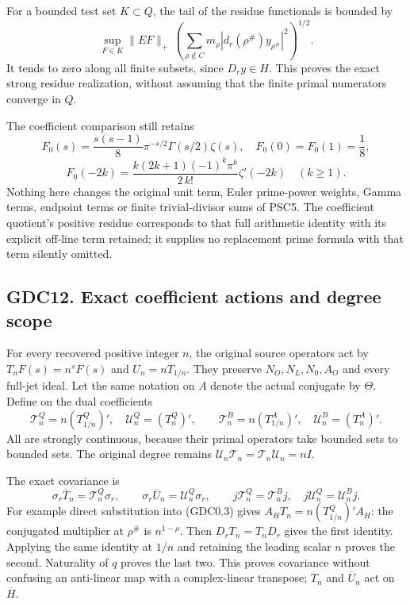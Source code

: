For a bounded test set \(K\subset Q\), the tail of the residue
functionals is bounded by \[
\sup_{F\in K}\|EF\|_+\,
\left(\sum_{\rho\notin C}m_\rho
|d_r(\rho^\#)y_{\rho^\#}|^2\right)^{1/2}.
\tag{GDC11.4}
\] It tends to zero along all finite subsets, since \(D_ry\in H\). This
proves the exact strong residue realization, without assuming that the
finite primal numerators converge in \(Q\).

The coefficient comparison still retains \[
F_0(s)=\frac{s(s-1)}8\pi^{-s/2}\Gamma(s/2)\zeta(s),
\quad F_0(0)=F_0(1)=\frac18,
\] \[
F_0(-2k)=\frac{k(2k+1)(-1)^k\pi^k}{2\,k!}\zeta'(-2k)
\quad(k\ge1).
\tag{GDC11.5}
\] Nothing here changes the original unit term, Euler prime-power
weights, Gamma terms, endpoint terms or finite trivial-divisor sums of
PSC5. The coefficient quotient's positive residue corresponds to that
full arithmetic identity with its explicit off-line term retained; it
supplies no replacement prime formula with that term silently omitted.

\subsection{GDC12. Exact coefficient actions and degree
scope}\label{gdc12.-exact-coefficient-actions-and-degree-scope}

For every recovered positive integer \(n\), the original source
operators act by \(T_nF(s)=n^sF(s)\) and \(U_n=nT_{1/n}\). They preserve
\(N_O,N_L,N_0,A_O\) and every full-jet ideal. Let the same notation on
\(A\) denote the actual conjugate by \(\Theta\). Define on the dual
coefficients \[
\mathcal T_n^Q=n(T_{1/n}^Q)',\quad
\mathcal U_n^Q=(T_n^Q)',\qquad
\mathcal T_n^B=n(T_{1/n}^A)',\quad
\mathcal U_n^B=(T_n^A)'.
\tag{GDC12.1}
\] All are strongly continuous, because their primal operators take
bounded sets to bounded sets. The original degree remains
\(\mathcal U_n\mathcal T_n=\mathcal T_n\mathcal U_n=nI\).

The exact covariance is \[
\sigma_r\overline T_n=\mathcal T_n^Q\sigma_r,
\qquad \sigma_r\overline U_n=\mathcal U_n^Q\sigma_r,
\qquad j\mathcal T_n^Q=\mathcal T_n^B j,
\quad j\mathcal U_n^Q=\mathcal U_n^B j.
\tag{GDC12.2}
\] For example direct substitution into (GDC0.3) gives
\(A_HT_n=n(T_{1/n}^Q)'A_H\): the conjugated multiplier at \(\rho^\#\) is
\(n^{1-\rho}\). Then \(D_rT_n=T_nD_r\) gives the first identity.
Applying the same identity at \(1/n\) and retaining the leading scalar
\(n\) proves the second. Naturality of \(q\) proves the last two. This
proves covariance without confusing an anti-linear map with a
complex-linear transpose; \(\overline T_n\) and \(\overline U_n\) act on
\(\overline H\).

